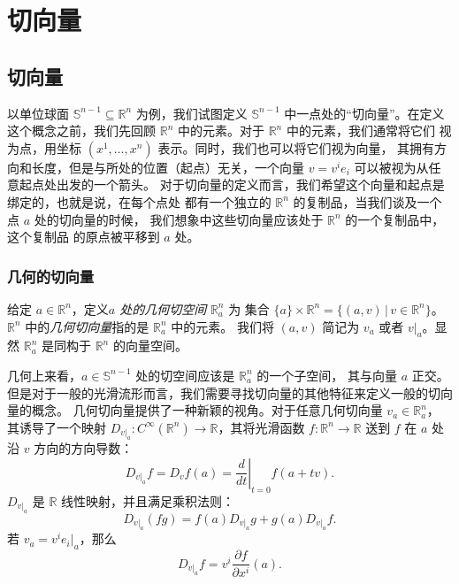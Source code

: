 \documentclass[fontset=none]{Notes}
\begin{document}
\frontmatter

\tableofcontents

\mainmatter






\chapter{切向量}

\section{切向量}

以单位球面 $\mathbb{S}^{n-1}\subseteq\mathbb{R}^n$ 为例，我们试图定义
$\mathbb{S}^{n-1}$ 中一点处的“切向量”。在定义这个概念之前，我们先回顾
$\mathbb{R}^n$ 中的元素。对于 $\mathbb{R}^n$ 中的元素，我们通常将它们
视为点，用坐标 $(x^1,\dots,x^n)$ 表示。同时，我们也可以将它们视为向量，
其拥有方向和长度，但是与所处的位置（起点）无关，一个向量 $v=v^ie_i$
可以被视为从任意起点处出发的一个箭头。
对于切向量的定义而言，我们希望这个向量和起点是绑定的，也就是说，在每个点处
都有一个独立的 $\mathbb{R}^n$ 的复制品，当我们谈及一个点 $a$ 处的切向量的时候，
我们想象中这些切向量应该处于 $\mathbb{R}^n$ 的一个复制品中，这个复制品
的原点被平移到 $a$ 处。


\subsection{几何的切向量}

给定 $a\in\mathbb{R}^n$，定义\emph{$a$ 处的几何切空间} $\mathbb{R}_a^n$ 为
集合 $\{a\}\times\mathbb{R}^n=\{(a,v)\,|\, v\in\mathbb{R}^n\}$。
$\mathbb{R}^n$ 中的\emph{几何切向量}指的是 $\mathbb{R}_a^n$ 中的元素。
我们将 $(a,v)$ 简记为 $v_a$ 或者 $v|_a$。显然 $\mathbb{R}_a^n$
是同构于 $\mathbb{R}^n$ 的向量空间。

几何上来看，$a\in\mathbb{S}^{n-1}$ 处的切空间应该是 $\mathbb{R}_a^n$ 的一个子空间，
其与向量 $a$ 正交。但是对于一般的光滑流形而言，我们需要寻找切向量的其他特征来定义一般的切向量的概念。
几何切向量提供了一种新颖的视角。对于任意几何切向量 $v_a\in\mathbb{R}_a^n$，
其诱导了一个映射 $D_{v|_a}:C^\infty(\mathbb{R}^n)\to\mathbb{R}$，其将光滑函数
$f:\mathbb{R}^n\to\mathbb{R}$ 送到 $f$ 在 $a$ 处沿 $v$ 方向的方向导数：
\[
  D_{v|_a}f=D_vf(a)=\left.\frac{d}{dt}\right|_{t=0}f(a+tv).  
\]
$D_{v|_a}$ 是 $\mathbb{R}$ 线性映射，并且满足乘积法则：
\[
  D_{v|_a}(fg)=f(a)D_{v|_a}g+g(a)D_{v|_a}f.
\]
若 $v_a=v^ie_{i}|_a$，那么
\[
  D_{v|_a}f=v^i\frac{\partial f}{\partial x^i}(a)  .
\]
\end{document}
